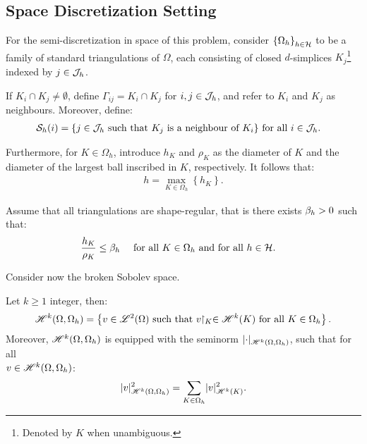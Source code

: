 \subsection{Space Discretization Setting}

For the semi-discretization in space of this problem, consider $\left\{ \Omega_{h} \right\}_{h \in \mathcal{H}}$ to be a family of standard triangulations of $\Omega$, each consisting of closed $d$-simplices $K_j$\footnote{Denoted by $K$ when unambiguous.} indexed by $j \in \mathcal{J}_h$. %

If $K_i \cap K_j \neq \emptyset$, define $\Gamma_{ij} = K_i \cap K_j$ for $i, j \in \mathcal{J}_h$, and refer to $K_i$ and $K_j$ as neighbours. Moreover, define:
\begin{align}
    \mathcal{S}_h(i) = \left\{ j \in \mathcal{J}_h \text{ such that } K_j \text{ is a neighbour of } K_i \right\} &\text{ for all } i \in \mathcal{J}_h.
\end{align}

Furthermore, for $K \in \Omega_h$, introduce $h_K$ and $\rho_K$ as the diameter of $K$ and the diameter of the largest ball inscribed in $K$, respectively. It follows that:
\begin{align}
    h = \max_{K \in \Omega_h} \left\{ h_K \right\}.
\end{align}

Assume that all triangulations are shape-regular, that is there exists $\beta_{h} > 0$ such that:
\begin{align}
    \frac{h_K}{\rho_K} &\leq \beta_{h} &\text{ for all } K \in \Omega_h &\text{ and for all } h \in \mathcal{H}.
\end{align}

Consider now the broken Sobolev space.
\begin{definition} %
    Let $k \geq 1$ integer, then:
    \begin{align}
        \mathscr{H}^{k}(\Omega, \Omega_h) = \left\{ v \in \mathscr{L}^{2}(\Omega) \text{ such that } v \!\!\restriction_{K} \in \mathscr{H}^{k}(K) \text{ for all } K \in \Omega_h \right\}.
    \end{align}
    Moreover, $\mathscr{H}^{k}(\Omega, \Omega_h)$ is equipped with the seminorm $\lvert \cdot \rvert_{\mathscr{H}^{k}(\Omega, \Omega_h)}$, such that for all \\ $v \in \mathscr{H}^{k}(\Omega, \Omega_h)$:
    \begin{align}
        \lvert v \rvert_{\mathscr{H}^{k}(\Omega, \Omega_h)}^2 = \sum_{K \in \Omega_h} \lvert v \rvert_{\mathscr{H}^{k}(K)}^2.
    \end{align}
\end{definition}

